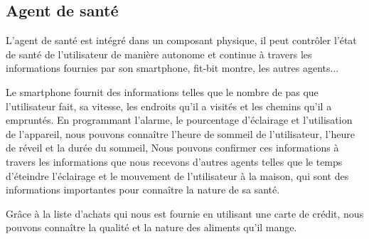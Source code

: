 \subsection{Agent de santé}
L'agent de santé est intégré dans un composant physique, il peut contrôler l'état de santé de l'utilisateur de manière autonome et continue à travers les informations fournies par son smartphone, fit-bit montre, les autres agents...


Le smartphone fournit des informations telles que le nombre de pas que l'utilisateur fait, sa vitesse, les endroits qu'il a visités et les chemins qu'il a empruntés. En programmant l'alarme, le pourcentage d'éclairage et l'utilisation de l'appareil, nous pouvons connaître l'heure de sommeil de l'utilisateur, l'heure de réveil et la durée du sommeil, Nous pouvons confirmer ces informations à travers les informations que nous recevons d'autres agents telles que le temps d'éteindre l'éclairage et le mouvement de l'utilisateur à la maison, qui sont des informations importantes pour connaître la nature de sa santé.


Grâce à la liste d'achats qui nous est fournie en utilisant une carte de crédit, nous pouvons connaître la qualité et la nature des aliments qu'il mange.



